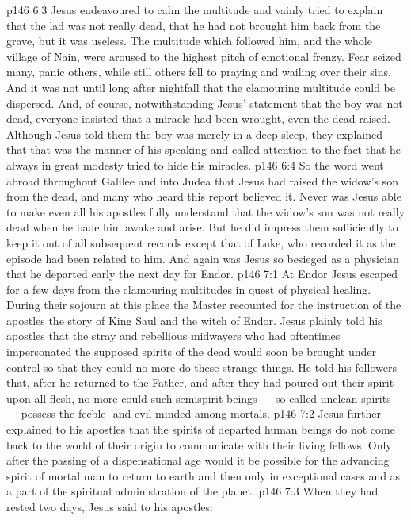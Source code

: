 \vs p146 6:3 Jesus endeavoured to calm the multitude and vainly tried to explain that the lad was not really dead, that he had not brought him back from the grave, but it was useless. The multitude which followed him, and the whole village of Nain, were aroused to the highest pitch of emotional frenzy. Fear seized many, panic others, while still others fell to praying and wailing over their sins. And it was not until long after nightfall that the clamouring multitude could be dispersed. And, of course, notwithstanding Jesus’ statement that the boy was not dead, everyone insisted that a miracle had been wrought, even the dead raised. Although Jesus told them the boy was merely in a deep sleep, they explained that that was the manner of his speaking and called attention to the fact that he always in great modesty tried to hide his miracles.
\vs p146 6:4 So the word went abroad throughout Galilee and into Judea that Jesus had raised the widow’s son from the dead, and many who heard this report believed it. Never was Jesus able to make even all his apostles fully understand that the widow’s son was not really dead when he bade him awake and arise. But he did impress them sufficiently to keep it out of all subsequent records except that of Luke, who recorded it as the episode had been related to him. And again was Jesus so besieged as a physician that he departed early the next day for Endor.
\vs p146 7:1 At Endor Jesus escaped for a few days from the clamouring multitudes in quest of physical healing. During their sojourn at this place the Master recounted for the instruction of the apostles the story of King Saul and the witch of Endor. Jesus plainly told his apostles that the stray and rebellious midwayers who had oftentimes impersonated the supposed spirits of the dead would soon be brought under control so that they could no more do these strange things. He told his followers that, after he returned to the Father, and after they had poured out their spirit upon all flesh, no more could such semispirit beings --- so\hyp{}called unclean spirits --- possess the feeble\hyp{} and evil\hyp{}minded among mortals.
\vs p146 7:2 Jesus further explained to his apostles that the spirits of departed human beings do not come back to the world of their origin to communicate with their living fellows. Only after the passing of a dispensational age would it be possible for the advancing spirit of mortal man to return to earth and then only in exceptional cases and as a part of the spiritual administration of the planet.
\vs p146 7:3 When they had rested two days, Jesus said to his apostles: 
